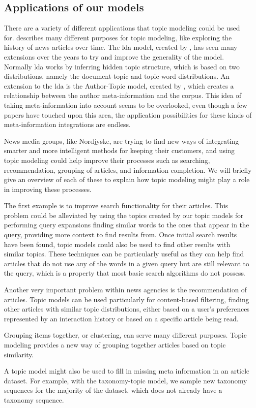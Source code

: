 \subsection{Applications of our models}\label{sec:appendix_applications}
There are a variety of different applications that topic modeling could be used for. 
\citet{Probabilistic_Topic_Models} describes many different purposes for topic modeling, like exploring the history of news articles over time.
The \gls{lda} model, created by \citet{blei2003latent}, has seen many extensions over the years to try and improve the generality of the model.
Normally \gls{lda} works by inferring hidden topic structure, which is based on two distributions, namely the document-topic and topic-word distributions.
An extension to the \gls{lda} is the Author-Topic model, created by \citet{author_topic_2012}, which creates a relationship between the author meta-information and the corpus.
This idea of taking meta-information into account seems to be overlooked, even though a few papers have touched upon this area, the application possibilities for these kinds of meta-information integrations are endless.

News media groups, like Nordjyske, are trying to find new ways of integrating smarter and more intelligent methods for keeping their customers, and using topic modeling could help improve their processes such as searching, recommendation, grouping of articles, and information completion.
We will briefly give an overview of each of these to explain how topic modeling might play a role in improving these processes.

The first example is to improve search functionality for their articles.
This problem could be alleviated by using the topics created by our topic models for performing query expansions finding similar words to the ones that appear in the query, providing more context to find results from.
Once initial search results have been found, topic models could also be used to find other results with similar topics.
These techniques can be particularly useful as they can help find articles that do not use any of the words in a given query but are still relevant to the query, which is a property that most basic search algorithms do not possess.

Another very important problem within news agencies is the recommendation of articles.
Topic models can be used particularly for content-based filtering, finding other articles with similar topic distributions, either based on a user's preferences represented by an interaction history or based on a specific article being read.

Grouping items together, or clustering, can serve many different purposes. 
Topic modeling provides a new way of grouping together articles based on topic similarity.

A topic model might also be used to fill in missing meta information in an article dataset.
For example, with the taxonomy-topic model, we sample new taxonomy sequences for the majority of the dataset, which does not already have a taxonomy sequence.
